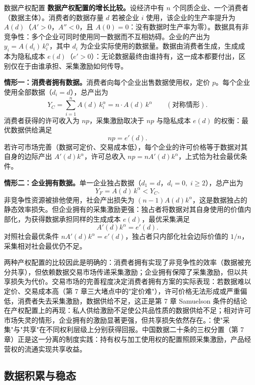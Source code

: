 \begin{derivation}{数据产权配置}{}
\textbf{数据产权配置的增长比较。}设经济中有 $n$ 个同质企业、一个消费者（数据主体）。消费者的数据存量 $d$ 若被企业 $i$ 使用，该企业的生产率提升为 $A(d)$（$A' > 0$，$A'' < 0$，且 $A(0) = 0$：没有数据时生产率为零）。数据具有非竞争性：多个企业可同时使用同一数据而不互相妨碍。企业的产出为 $y_i = A(d_i)\, k_i^\alpha$，其中 $d_i$ 为企业实际使用的数据量。数据由消费者生成，生成成本为隐私成本 $e(d)$（$e' > 0$）：无论数据最终由谁持有，这一成本都要付出，区别仅在于由谁承担、采集激励如何传导。

\textbf{情形一：消费者拥有数据。}消费者向每个企业出售数据使用权，定价 $p$。每个企业使用全部数据（$d_i = d$），总产出为
\[
Y_C = \sum_{i=1}^{n} A(d)\, k_i^\alpha = n \cdot A(d)\, k^\alpha \qquad (\text{对称情形}).
\]
消费者获得的许可收入为 $n p$，采集激励取决于 $n p$ 与隐私成本 $e(d)$ 的权衡：最优数据供给满足
\[
n p = e'(d).
\]
若许可市场完善（数据可定价、交易成本低），每个企业的许可价格等于数据对其自身的边际产出 $A'(d) k^\alpha$，许可总收入 $np = nA'(d) k^\alpha$，上式恰为社会最优条件。

\textbf{情形二：企业拥有数据。}单一企业独占数据（$d_1 = d$，$d_i = 0,\; i \geq 2$），总产出为
\[
Y_F = A(d)\, k^\alpha < Y_C.
\]
非竞争性资源被排他使用，社会产出损失为 $(n-1)A(d)k^\alpha$，这是数据独占的静态效率损失。但企业拥有的采集激励更强：独占者将数据对其自身使用的价值内部化，为获得数据承担同样的生成成本 $e(d)$，最优采集满足
\[
A'(d) k^\alpha = e'(d).
\]
对照社会最优条件 $nA'(d)k^\alpha = e'(d)$，独占者只内部化社会边际价值的 $1/n$，采集相对社会最优仍不足。
\end{derivation}

两种产权配置的比较因此是明确的：消费者拥有实现了非竞争性的效率（数据被充分共享），但依赖数据交易市场传递采集激励；企业拥有保障了采集激励，但以共享损失为代价。交易市场的完善程度决定消费者拥有方案的实际表现：若数据难以定价、交易成本高（第 7 章三大堵点中的"定价难"），许可价格无法形成或严重偏低，消费者失去采集激励，数据供给不足，这正是第 7 章 Samuelson 条件的结论在产权配置上的再现：私人供给激励不足使公共品性质的数据供给不足；相对许可市场失灵的情形，企业拥有的激励显著更强，但共享损失依然存在。：使"采集"与"共享"在不同权利层级上分别获得回报。中国数据二十条的三权分置（第 7 章）正是这一分离的制度实践：持有权与加工使用权的配置照顾采集激励，产品经营权的流通实现共享收益。

\subsection{数据积累与稳态}

